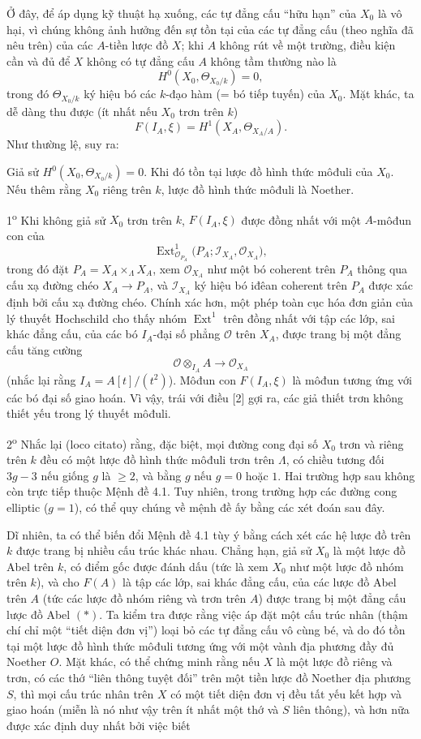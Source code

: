 Ở đây, để áp dụng kỹ thuật hạ xuống, các tự đẳng cấu ``hữu hạn'' của $X_0$ là
vô hại, vì chúng không ảnh hưởng đến sự tồn tại của các tự đẳng cấu (theo
nghĩa đã nêu trên) của các $A$-tiền lược đồ $X$; khi $A$ không rút về một
trường, điều kiện cần và đủ để $X$ không có tự đẳng cấu $A$ không tầm thường
nào là
\[
  H^0(X_0,\Theta_{X_0/k})=0,
\]
trong đó $\Theta_{X_0/k}$ ký hiệu bó các $k$-đạo hàm (= bó tiếp tuyến) của
$X_0$. Mặt khác, ta dễ dàng thu được (ít nhất nếu $X_0$ trơn trên $k$)
\[
  F(I_A,\xi)=H^1(X_A,\Theta_{X_A/A}).
\]
Như thường lệ, suy ra:

 Giả sử
$H^0(X_0,\Theta_{X_0/k})=0$. Khi đó tồn tại lược đồ hình thức môđuli của
$X_0$. Nếu thêm rằng $X_0$ riêng trên $k$, lược đồ hình thức môđuli là
Noether.

 1\textsuperscript{o} Khi không giả sử $X_0$ trơn trên
$k$, $F(I_A,\xi)$ được đồng nhất với một $A$-môđun con của
\[
  \operatorname{Ext}^1_{\mathcal O_{P_A}}
  \bigl(P_A;\mathcal I_{X_A},\mathcal O_{X_A}\bigr),
\]
trong đó đặt $P_A=X_A\times_\Lambda X_A$, xem $\mathcal O_{X_A}$ như một bó
coherent trên $P_A$ thông qua cấu xạ đường chéo
$X_A\longrightarrow P_A$, và $\mathcal I_{X_A}$ ký hiệu bó iđêan coherent
trên $P_A$ được xác định bởi cấu xạ đường chéo. Chính xác hơn, một phép toàn
cục hóa đơn giản của lý thuyết Hochschild cho thấy nhóm
$\operatorname{Ext}^1$ trên đồng nhất với tập các lớp, sai khác đẳng cấu, của
các bó $I_A$-đại số phẳng $\mathcal O$ trên $X_A$, được trang bị một đẳng cấu
tăng cường
\[
  \mathcal O\otimes_{I_A}A\longrightarrow\mathcal O_{X_A}
\]
(nhắc lại rằng $I_A=A[t]/(t^2)$). Môđun con $F(I_A,\xi)$ là môđun tương ứng
với các bó đại số giao hoán. Vì vậy, trái với điều [2] gợi ra, các giả thiết
trơn không thiết yếu trong lý thuyết môđuli.

2\textsuperscript{o} Nhắc lại (loco citato) rằng, đặc biệt, mọi đường cong đại
số $X_0$ trơn và riêng trên $k$ đều có một lược đồ hình thức môđuli trơn trên
$\Lambda$, có chiều tương đối $3g-3$ nếu giống $g$ là $\geq2$, và bằng $g$ nếu
$g=0$ hoặc $1$. Hai trường hợp sau không còn trực tiếp thuộc Mệnh đề 4.1. Tuy
nhiên, trong trường hợp các đường cong elliptic ($g=1$), có thể quy chúng về
mệnh đề ấy bằng các xét đoán sau đây.

Dĩ nhiên, ta có thể biến đổi Mệnh đề 4.1 tùy ý bằng cách xét các hệ lược đồ
trên $k$ được trang bị nhiều cấu trúc khác nhau. Chẳng hạn, giả sử $X_0$ là
một lược đồ Abel trên $k$, có điểm gốc được đánh dấu (tức là xem $X_0$ như một
lược đồ nhóm trên $k$), và cho $F(A)$ là tập các lớp, sai khác đẳng cấu, của
các lược đồ Abel trên $A$ (tức các lược đồ nhóm riêng và trơn trên $A$) được
trang bị một đẳng cấu lược đồ Abel $(*)$. Ta kiểm tra được rằng việc áp đặt một
cấu trúc nhân (thậm chí chỉ một ``tiết diện đơn vị'') loại bỏ các tự đẳng cấu
vô cùng bé, và do đó tồn tại một lược đồ hình thức môđuli tương ứng với một
vành địa phương đầy đủ Noether $O$. Mặt khác, có thể chứng minh rằng nếu $X$
là một lược đồ riêng và trơn, có các thớ ``liên thông tuyệt đối'' trên một tiền
lược đồ Noether địa phương $S$, thì mọi cấu trúc nhân trên $X$ có một tiết
diện đơn vị đều tất yếu kết hợp và giao hoán (miễn là nó như vậy trên ít nhất
một thớ và $S$ liên thông), và hơn nữa được xác định duy nhất bởi việc biết

